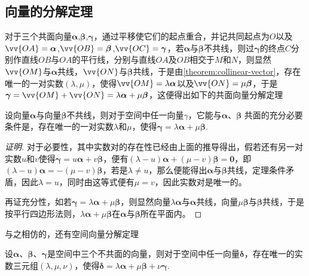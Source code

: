 \subsection{向量的分解定理}
\label{sec:decompose-of-vector}
对于三个共面向量$\bm{\alpha}$,$\bm{\beta}$,$\bm{\gamma}$，通过平移使它们的起点重合，并记共同起点为$O$以及$\vv{OA}=\bm{\alpha}$,$\vv{OB}=\bm{\beta}$,$\vv{OC}=\bm{\gamma}$，若$\bm{\alpha}$与$\bm{\beta}$不共线，则过$\bm{\gamma}$的终点$C$分别作直线$OB$与$OA$的平行线，分别与直线$OA$及$OB$相交于$M$和$N$，则显然$\vv{OM}$与$\bm{\alpha}$共线，$\vv{ON}$与$\bm{\beta}$共线，于是由\autoref{theorem:collinear-vector}，存在唯一的一对实数$(\lambda,\mu)$，使得$\vv{OM}=\lambda \bm{\alpha}$以及$\vv{ON}=\mu \bm{\beta}$，于是$\bm{\gamma}=\vv{OM}+\vv{ON}=\lambda \bm{\alpha} + \mu \bm{\beta}$，这便得出如下的共面向量分解定理
\begin{theorem}[共面向量分解定理]
  \label{theorem:coplanar-vector}
 设向量$\bm{\alpha}$与向量$\bm{\beta}$不共线，则对于空间中任一向量$\gamma$，它能与$\bm{\alpha}$、$\bm{\beta}$ 共面的充分必要条件是，存在唯一的一对实数$\lambda$和$\mu$，使得$\bm{\gamma}=\lambda \bm{\alpha} + \mu \bm{\beta}$.
\end{theorem}

\begin{proof}[证明]
  对于必要性，其中实数对的存在性已经由上面的推导得出，假若还有另一对实数$u$和$v$使得$\bm{\gamma}=u \bm{\alpha} + v \bm{\beta}$，便有$(\lambda-u)\bm{\alpha}+(\mu-v)\bm{\beta}=\bm{0}$，即$(\lambda-u)\bm{\alpha}=-(\mu-v)\bm{\beta}$，若是$\lambda \neq u$，那么便能得出$\bm{\alpha}$与$\bm{\beta}$共线，定理条件矛盾，因此$\lambda=u$，同时由这等式便有$\mu=v$，因此实数对是唯一的。

  再证充分性，如若$\bm{\gamma}=\lambda \bm{\alpha} + \mu \bm{\beta}$，则显然向量$\lambda \bm{\alpha}$与$\bm{\alpha}$共线，向量$\mu \bm{\beta}$与$\bm{\beta}$共线，于是按平行四边形法则，$\lambda \bm{\alpha}+\mu \bm{\beta}$在$\bm{\alpha}$与$\bm{\beta}$所在平面内。
\end{proof}

与之相仿的，还有空间向量分解定理
\begin{theorem}[空间向量分解定理]
  \label{theorem:space-vector-decompose}
  设$\bm{\alpha}$、$\bm{\beta}$、$\bm{\gamma}$是空间中三个不共面的向量，则对于空间中任一向量$\bm{\delta}$，存在唯一的实数三元组$(\lambda, \mu, \nu)$，使得$\bm{\delta}=\lambda \bm{\alpha} + \mu \bm{\beta} + \nu \bm{\gamma}$.
\end{theorem}

